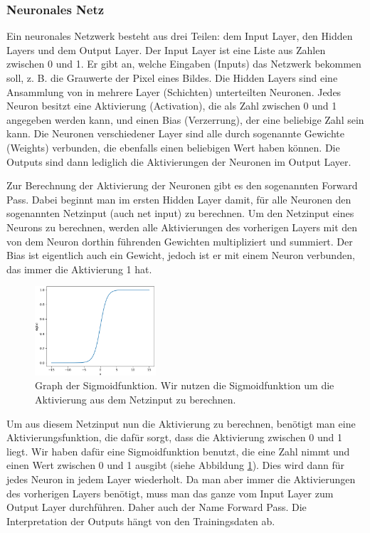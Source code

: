 \documentclass[11pt]{scrartcl}
\begin{document}
	\subsubsection{Neuronales Netz}

	Ein neuronales Netzwerk besteht aus drei Teilen: dem Input Layer, den Hidden Layers und dem Output Layer. 
	Der Input Layer ist eine Liste aus Zahlen zwischen 0 und 1. Er gibt an, welche Eingaben (Inputs) das Netzwerk bekommen soll, z. B. die Grauwerte der Pixel eines Bildes.
	Die Hidden Layers sind eine Ansammlung von in mehrere Layer (Schichten) unterteilten Neuronen.
	Jedes Neuron besitzt eine Aktivierung (Activation), die als Zahl zwischen 0 und 1 angegeben werden kann, und einen Bias (Verzerrung), der eine beliebige Zahl sein kann. Die Neuronen verschiedener Layer sind alle durch sogenannte Gewichte (Weights) verbunden, die ebenfalls einen beliebigen Wert haben können.
	Die Outputs sind dann lediglich die Aktivierungen der Neuronen im Output Layer.


	Zur Berechnung der Aktivierung der Neuronen gibt es den sogenannten Forward Pass. Dabei beginnt man im ersten Hidden Layer damit, für alle Neuronen den sogenannten Netzinput (auch net input) zu berechnen. Um den Netzinput eines Neurons zu berechnen, werden alle Aktivierungen des vorherigen Layers mit den von dem Neuron dorthin führenden Gewichten multipliziert und summiert. Der Bias ist eigentlich auch ein Gewicht, jedoch ist er mit einem Neuron verbunden, das immer die Aktivierung 1 hat.

	\begin{figure}
		\centering
		\vspace*{-5mm}
		\includegraphics[width=0.4\textwidth]{pictures/sig_func.png}
		\caption{Graph der Sigmoidfunktion. Wir nutzen die Sigmoidfunktion um die Aktivierung aus dem Netzinput zu berechnen.}
		\label{sig_func}
	\end{figure}

	Um aus diesem Netzinput nun die Aktivierung zu berechnen, benötigt man eine Aktivierungsfunktion, die dafür sorgt, dass die Aktivierung zwischen 0 und 1 liegt. Wir haben dafür eine Sigmoidfunktion benutzt, die eine Zahl nimmt und einen Wert zwischen 0 und 1 ausgibt (siehe Abbildung \ref{sig_func}). Dies wird dann für jedes Neuron in jedem Layer wiederholt. Da man aber immer die Aktivierungen des vorherigen Layers benötigt, muss man das ganze vom Input Layer zum Output Layer durchführen. Daher auch der Name Forward Pass. Die Interpretation der Outputs hängt von den Trainingsdaten ab.
	
\end{document}
